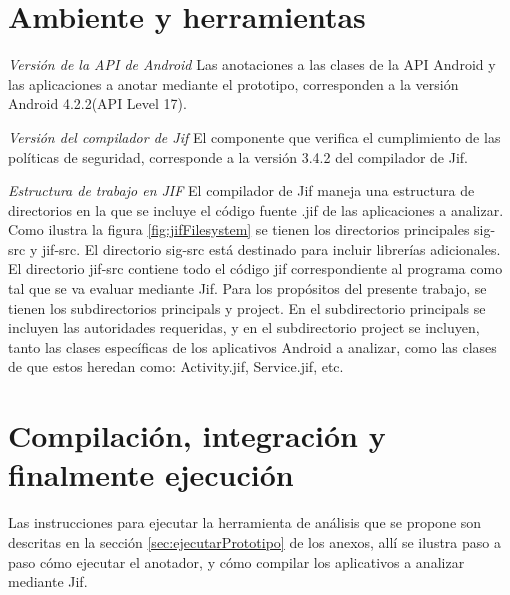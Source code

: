 \section{Ambiente y herramientas}
\textit{Versión de la API de Android}\newline
Las anotaciones a las clases de la API Android y las aplicaciones a anotar
mediante el prototipo, corresponden a la versión Android 4.2.2(API Level 17).

\textit{Versión del compilador de Jif}\newline
El componente que verifica el cumplimiento de las políticas de seguridad,
corresponde a la versión 3.4.2 del compilador de Jif.

\textit{Estructura de trabajo en JIF}\newline
El compilador de Jif maneja una estructura de directorios en la que se incluye
el código fuente .jif de las aplicaciones a analizar. Como ilustra la figura
\ref{fig:jifFilesystem} se tienen los directorios principales sig-src y jif-src.
El directorio sig-src está destinado para incluir librerías adicionales.\newline 
El directorio jif-src contiene todo el código jif correspondiente al programa
como tal que se va evaluar mediante Jif. Para los propósitos del presente
trabajo, se tienen los subdirectorios principals y project. En el subdirectorio
principals se incluyen las autoridades requeridas, y en el subdirectorio
project se incluyen, tanto las clases específicas de los aplicativos Android a
analizar, como las clases de que estos heredan como: Activity.jif, Service.jif,
etc.

\section{Compilación, integración y finalmente ejecución }
Las instrucciones para ejecutar la herramienta de análisis que se propone son
descritas en la sección \ref{sec:ejecutarPrototipo} de los anexos, allí se
ilustra paso a paso cómo ejecutar el anotador, y cómo compilar los aplicativos
a analizar mediante Jif.
